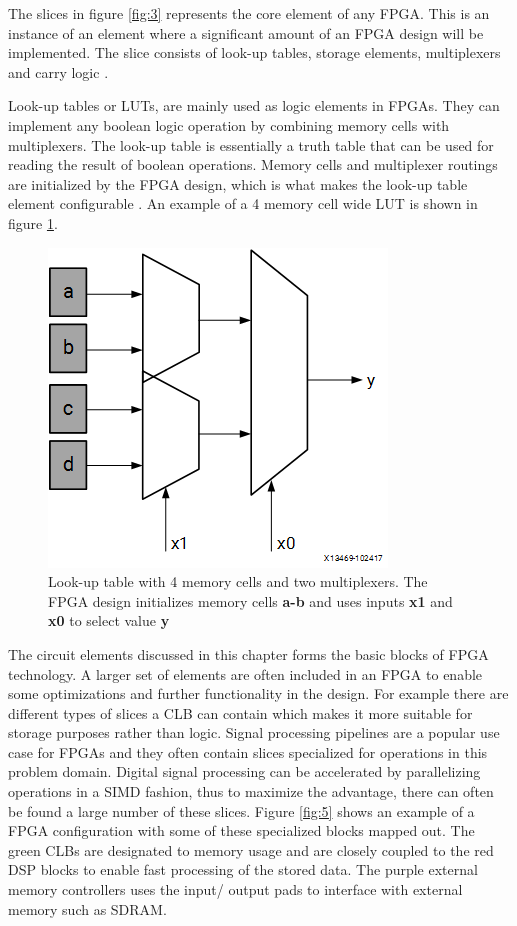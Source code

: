 \documentclass[12pt]{report}
\begin{document}
The slices in figure \ref{fig:3} represents the core element of any FPGA. This is an instance of an element where a significant amount of an FPGA design will be implemented. The slice consists of look-up tables, storage elements, multiplexers and carry logic \citep{XilClbMan}.

Look-up tables or LUTs, are mainly used as logic elements in FPGAs. They can implement any boolean logic operation by combining memory cells with multiplexers. The look-up table is essentially a truth table that can be used for reading the result of boolean operations. Memory cells and multiplexer routings are initialized by the FPGA design, which is what makes the look-up table element configurable \citep{XilLUT}. An example of a 4 memory cell wide LUT is shown in figure \ref{fig:4}.

\begin{figure}[h]
    \centering
    \includegraphics[scale=0.5]{figures/lut.png}
    \caption{Look-up table with 4 memory cells and two multiplexers. The FPGA design initializes memory cells \textbf{a-b} and uses inputs \textbf{x1} and \textbf{x0} to select value \textbf{y} \citep{XilLUT}}
    \label{fig:4}
\end{figure}

The circuit elements discussed in this chapter forms the basic blocks of FPGA technology. A larger set of elements are often included in an FPGA to enable some optimizations and further functionality in the design. For example there are different types of slices a CLB can contain which makes it more suitable for storage purposes rather than logic. Signal processing pipelines are a popular use case for FPGAs and they often contain slices specialized for operations in this problem domain. Digital signal processing can be accelerated by parallelizing operations in a SIMD fashion, thus to maximize the advantage, there can often be found a large number of these slices. Figure \ref{fig:5} shows an example of a FPGA configuration with some of these specialized blocks mapped out. The green CLBs are designated to memory usage and are closely coupled to the red DSP blocks to enable fast processing of the stored data. The purple external memory controllers uses the input/ output pads to interface with external memory such as SDRAM.
\end{document}
